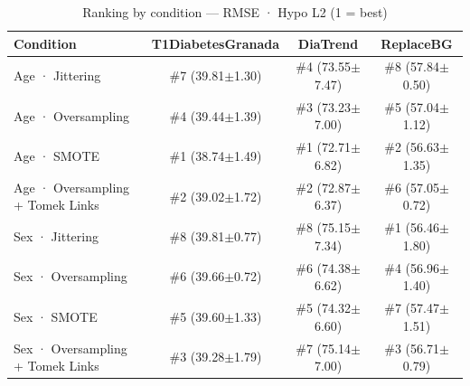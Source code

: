 \begin{table}[htbp]
\centering
\small
\caption{Ranking by condition — RMSE · Hypo L2  (1 = best)}
\label{tab:ranking_rmse_tbr_2_family_size_oversampling}
\begin{tabular}{lccc}
\toprule
\textbf{Condition} & \textbf{T1DiabetesGranada} & \textbf{DiaTrend} & \textbf{ReplaceBG} \\
\midrule
Age · Jittering & \#7 (39.81$\pm$1.30) & \#4 (73.55$\pm$7.47) & \#8 (57.84$\pm$0.50) \\
Age · Oversampling & \#4 (39.44$\pm$1.39) & \#3 (73.23$\pm$7.00) & \#5 (57.04$\pm$1.12) \\
Age · SMOTE & \#1 (38.74$\pm$1.49) & \#1 (72.71$\pm$6.82) & \#2 (56.63$\pm$1.35) \\
Age · Oversampling + Tomek Links & \#2 (39.02$\pm$1.72) & \#2 (72.87$\pm$6.37) & \#6 (57.05$\pm$0.72) \\
\midrule
Sex · Jittering & \#8 (39.81$\pm$0.77) & \#8 (75.15$\pm$7.34) & \#1 (56.46$\pm$1.80) \\
Sex · Oversampling & \#6 (39.66$\pm$0.72) & \#6 (74.38$\pm$6.62) & \#4 (56.96$\pm$1.40) \\
Sex · SMOTE & \#5 (39.60$\pm$1.33) & \#5 (74.32$\pm$6.60) & \#7 (57.47$\pm$1.51) \\
Sex · Oversampling + Tomek Links & \#3 (39.28$\pm$1.79) & \#7 (75.14$\pm$7.00) & \#3 (56.71$\pm$0.79) \\
\bottomrule
\end{tabular}
\end{table}